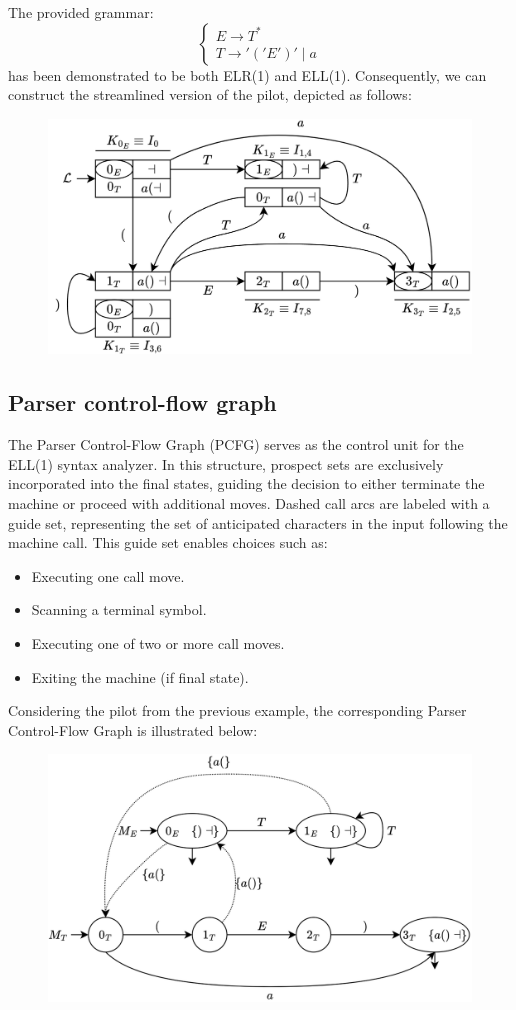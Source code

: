 \begin{example}
    The provided grammar:
    \[\begin{cases}
        E \rightarrow T^{\ast} \\
        T \rightarrow '('E')'\mid a
    \end{cases}\]
    has been demonstrated to be both ELR(1) and ELL(1). 
    Consequently, we can construct the streamlined version of the pilot, depicted as follows:
    \begin{figure}[H]
        \centering
        \includegraphics[width=0.6\linewidth]{images/pil1.png}
    \end{figure}
\end{example}

\subsection{Parser control-flow graph}
The Parser Control-Flow Graph (PCFG) serves as the control unit for the ELL(1) syntax analyzer. 
In this structure, prospect sets are exclusively incorporated into the final states, guiding the decision to either terminate the machine or proceed with additional moves.
Dashed call arcs are labeled with a guide set, representing the set of anticipated characters in the input following the machine call. 
This guide set enables choices such as:
\begin{itemize}
    \item Executing one call move. 
    \item Scanning a terminal symbol. 
    \item Executing one of two or more call moves. 
    \item Exiting the machine (if final state).
\end{itemize}
\begin{example}
    Considering the pilot from the previous example, the corresponding Parser Control-Flow Graph is illustrated below:
    \begin{figure}[H]
        \centering
        \includegraphics[width=0.6\linewidth]{images/pcfg.png}
    \end{figure}
\end{example}

